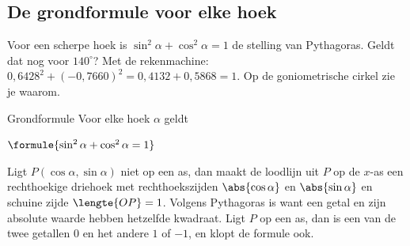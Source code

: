 \begin{oefeningen}
\end{oefeningen}

\subsection{De grondformule voor elke hoek}

Voor een scherpe hoek is $\sin^2\alpha + \cos^2\alpha = 1$ de stelling van Pythagoras. Geldt dat nog voor $140^\circ$? Met de rekenmachine: $0{,}6428^2 + ({-0{,}7660})^2 = 0{,}4132 + 0{,}5868 = 1$. Op de goniometrische cirkel zie je waarom.

\begin{theorie}
\begin{minipage}[t]{.64\linewidth}
\vspace{0pt}
\begin{stelling}{Grondformule}
Voor elke hoek $\alpha$ geldt

\vspace{1mm}
\qquad $\formule{\sin^2\alpha + \cos^2\alpha = 1}$
\end{stelling}

\begin{bewijs}
Ligt $P(\cos\alpha, \sin\alpha)$ niet op een as, dan maakt de loodlijn uit $P$ op de $x$-as een rechthoekige driehoek met rechthoekszijden $\abs{\cos\alpha}$ en $\abs{\sin\alpha}$ en schuine zijde $\lengte{OP} = 1$. Volgens Pythagoras is
want een getal en zijn absolute waarde hebben hetzelfde kwadraat. Ligt $P$ op een as, dan is een van de twee getallen 0 en het andere $1$ of $-1$, en klopt de formule ook.
\end{bewijs}
\end{minipage}\hfill
\begin{minipage}[t]{.32\linewidth}
\vspace{2mm}
\centering
{}
\end{minipage}
\end{theorie}

